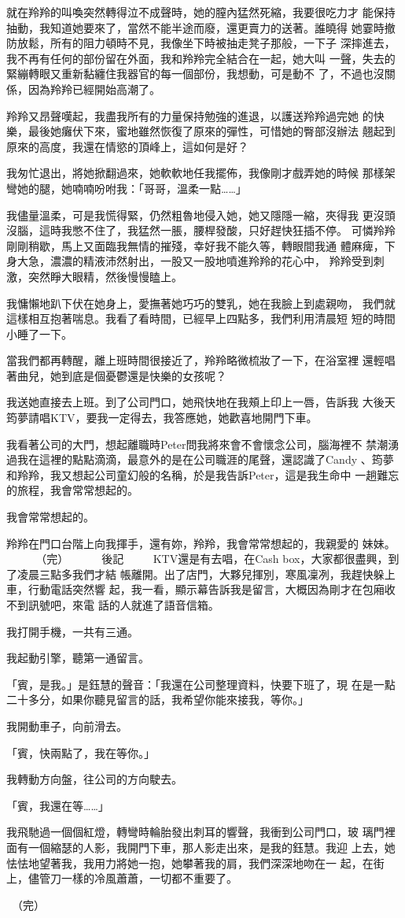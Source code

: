 就在羚羚的叫喚突然轉得泣不成聲時，她的膣內猛然死縮，我要很吃力才
能保持抽動，我知道她要來了，當然不能半途而廢，還更賣力的送著。誰曉得
她霎時撤防放鬆，所有的阻力頓時不見，我像坐下時被抽走凳子那般，一下子
深摔進去，我不再有任何的部份留在外面，我和羚羚完全結合在一起，她大叫
一聲，失去的緊繃轉眼又重新黏纏住我器官的每一個部份，我想動，可是動不
了，不過也沒關係，因為羚羚已經開始高潮了。

羚羚又昂聲嘆起，我盡我所有的力量保持勉強的進退，以護送羚羚過完她
的快樂，最後她癱伏下來，蜜地雖然恢復了原來的彈性，可惜她的臀部沒辦法
翹起到原來的高度，我還在情慾的頂峰上，這如何是好？

我匆忙退出，將她掀翻過來，她軟軟地任我擺佈，我像剛才戲弄她的時候
那樣架彎她的腿，她喃喃吩咐我：「哥哥，溫柔一點……」

我儘量溫柔，可是我慌得緊，仍然粗魯地侵入她，她又隱隱一縮，夾得我
更沒頭沒腦，這時我憋不住了，我猛然一脹，腰桿發酸，只好趕快狂插不停。
可憐羚羚剛剛稍歇，馬上又面臨我無情的摧殘，幸好我不能久等，轉眼間我通
體麻痺，下身大急，濃濃的精液沛然射出，一股又一股地噴進羚羚的花心中，
羚羚受到刺激，突然睜大眼精，然後慢慢瞌上。

我慵懶地趴下伏在她身上，愛撫著她巧巧的雙乳，她在我臉上到處親吻，
我們就這樣相互抱著喘息。我看了看時間，已經早上四點多，我們利用清晨短
短的時間小睡了一下。

當我們都再轉醒，離上班時間很接近了，羚羚略微梳妝了一下，在浴室裡
還輕唱著曲兒，她到底是個憂鬱還是快樂的女孩呢？

我送她直接去上班。到了公司門口，她飛快地在我頰上印上一唇，告訴我
大後天筠夢請唱KTV，要我一定得去，我答應她，她歡喜地開門下車。

我看著公司的大門，想起離職時Peter問我將來會不會懷念公司，腦海裡不
禁潮湧過我在這裡的點點滴滴，最意外的是在公司職涯的尾聲，還認識了Candy
、筠夢和羚羚，我又想起公司童幻般的名稱，於是我告訴Peter，這是我生命中
一趟難忘的旅程，我會常常想起的。

我會常常想起的。

羚羚在門口台階上向我揮手，還有妳，羚羚，我會常常想起的，我親愛的
妹妹。
　
　
（完）
　
　
後記　
　
KTV還是有去唱，在Cash box，大家都很盡興，到了凌晨三點多我們才結
帳離開。出了店門，大夥兒揮別，寒風凜冽，我趕快躲上車，行動電話突然響
起，我一看，顯示幕告訴我是留言，大概因為剛才在包廂收不到訊號吧，來電
話的人就進了語音信箱。

我打開手機，一共有三通。

我起動引擎，聽第一通留言。

「賓，是我。」是鈺慧的聲音：「我還在公司整理資料，快要下班了，現
在是一點二十多分，如果你聽見留言的話，我希望你能來接我，等你。」

我開動車子，向前滑去。

「賓，快兩點了，我在等你。」

我轉動方向盤，往公司的方向駛去。

「賓，我還在等……」

我飛馳過一個個紅燈，轉彎時輪胎發出刺耳的響聲，我衝到公司門口，玻
璃門裡面有一個縮瑟的人影，我開門下車，那人影走出來，是我的鈺慧。我迎
上去，她怯怯地望著我，我用力將她一抱，她攀著我的肩，我們深深地吻在一
起，在街上，儘管刀一樣的冷風蕭蕭，一切都不重要了。　

　（完）










